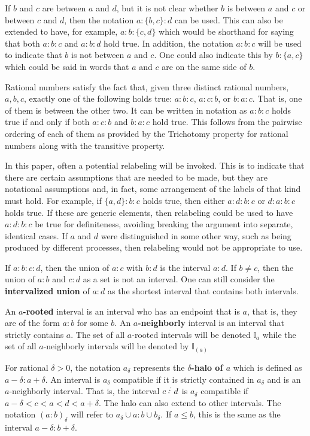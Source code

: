 \documentclass[12pt]{article}
\begin{document}
If $b$ and $c$ are between $a$ and $d$, but it is not clear whether $b$ is between $a$ and $c$ or between $c$ and $d$, then the notation $a:\{b,c\}:d$ can be used. This can also be extended to have, for example, $a:b:\{c,d\}$ which would be shorthand for saying that both $a:b:c$ and $a:b:d$ hold true. In addition, the notation \sout{$a:b:c$} will be used to indicate that $b$ is not between $a$ and $c$. One could also indicate this by $b:\{a,c\}$ which could be said in words that $a$ and $c$ are on the same side of $b$. 

Rational numbers satisfy the fact that, given three distinct rational numbers, $a, b, c$, exactly one of the following holds true: $a:b:c$, $a:c:b$, or $b:a:c$. That is, one of them is between the other two. It can be written in notation as $a:b:c$ holds true if and only if both \sout{$a:c:b$} and \sout{$b:a:c$} hold true. This follows from the pairwise ordering of each of them as provided by the Trichotomy property for rational numbers along with the transitive property. 

In this paper, often a potential relabeling will be invoked. This is to indicate that there are certain assumptions that are needed to be made, but they are notational assumptions and, in fact, some arrangement of the labels of that kind must hold. For example, if $\{a,d\}:b:c$ holds true, then either $a:d:b:c$ or $d:a:b:c$ holds true. If these are generic elements, then relabeling could be used to have $a:d:b:c$  be  true for definiteness, avoiding breaking the argument into separate, identical cases. If $a$ and $d$ were distinguished in some other way, such as being produced by different processes, then relabeling would not be appropriate to use. 

If $a:b:c:d$, then the union of $a:c$ with $b:d$ is the interval $a:d$. If $b \neq c$, then the union of $a:b$ and $c:d$ as a set is not an interval. One can still consider the \textbf{intervalized union} of $a:d$ as the shortest interval that contains both intervals. 

An \textbf{$a$-rooted} interval is an interval who has an endpoint that is $a$, that is, they are of the form $a:b$ for some $b$. An  \textbf{$a$-neighborly} interval is an interval that strictly contains $a$. The set of all $a$-rooted intervals will be denoted $\mathbb{I}_a$ while the set of all $a$-neighborly intervals will be denoted by $\mathbb{I}_{(a)}$

For rational $\delta > 0$, the notation $a_\delta$ represents the \textbf{$\delta$-halo of $a$} which is defined as $a -\delta : a+ \delta$. An interval is $a_\delta$ compatible if it is strictly contained in $a_\delta$ and is an $a$-neighborly interval. That is, the interval $c\lte d$ is $a_\delta$ compatible if $a- \delta < c < a < d < a+ \delta$. The halo can also extend to other intervals. The notation $(a:b)_\delta$ will refer to $a_\delta \cup a:b \cup b_\delta$. If $a \leq b$, this is the same as the interval $a-\delta:b+\delta$. 
\end{document}
